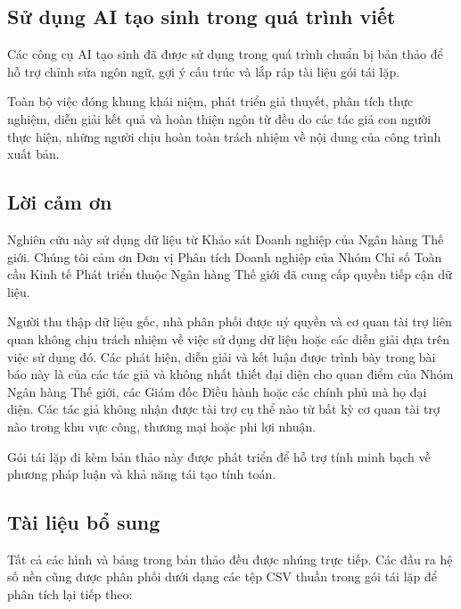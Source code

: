 \documentclass[12pt,a4paper]{article}
\begin{document}
\hypertarget{sux1eed-dux1ee5ng-ai-tux1ea1o-sinh-trong-quuxe1-truxecnh-viux1ebft}{%
\subsection{Sử dụng AI tạo sinh trong quá trình
viết}\label{sux1eed-dux1ee5ng-ai-tux1ea1o-sinh-trong-quuxe1-truxecnh-viux1ebft}}

Các công cụ AI tạo sinh đã được sử dụng trong quá trình chuẩn bị bản
thảo để hỗ trợ chỉnh sửa ngôn ngữ, gợi ý cấu trúc và lắp ráp tài liệu
gói tái lặp.

Toàn bộ việc đóng khung khái niệm, phát triển giả thuyết, phân tích thực
nghiệm, diễn giải kết quả và hoàn thiện ngôn từ đều do các tác giả con
người thực hiện, những người chịu hoàn toàn trách nhiệm về nội dung của
công trình xuất bản.

\hypertarget{lux1eddi-cux1ea3m-ux1a1n}{%
\subsection{Lời cảm ơn}\label{lux1eddi-cux1ea3m-ux1a1n}}

Nghiên cứu này sử dụng dữ liệu từ Khảo sát Doanh nghiệp của Ngân hàng
Thế giới. Chúng tôi cảm ơn Đơn vị Phân tích Doanh nghiệp của Nhóm Chỉ số
Toàn cầu Kinh tế Phát triển thuộc Ngân hàng Thế giới đã cung cấp quyền
tiếp cận dữ liệu.

Người thu thập dữ liệu gốc, nhà phân phối được uỷ quyền và cơ quan tài
trợ liên quan không chịu trách nhiệm về việc sử dụng dữ liệu hoặc các
diễn giải dựa trên việc sử dụng đó. Các phát hiện, diễn giải và kết luận
được trình bày trong bài báo này là của các tác giả và không nhất thiết
đại diện cho quan điểm của Nhóm Ngân hàng Thế giới, các Giám đốc Điều
hành hoặc các chính phủ mà họ đại diện. Các tác giả không nhận được tài
trợ cụ thể nào từ bất kỳ cơ quan tài trợ nào trong khu vực công, thương
mại hoặc phi lợi nhuận.

Gói tái lặp đi kèm bản thảo này được phát triển để hỗ trợ tính minh bạch
về phương pháp luận và khả năng tái tạo tính toán.

\hypertarget{tuxe0i-liux1ec7u-bux1ed5-sung}{%
\subsection{Tài liệu bổ sung}\label{tuxe0i-liux1ec7u-bux1ed5-sung}}

Tất cả các hình và bảng trong bản thảo đều được nhúng trực tiếp. Các đầu
ra hệ số nền cũng được phân phối dưới dạng các tệp CSV thuần trong gói
tái lặp để phân tích lại tiếp theo:
\end{document}
